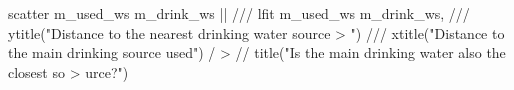 scatter m_used_ws m_drink_ws  || ///
lfit m_used_ws m_drink_ws, ///
        ytitle("Distance to the nearest drinking water source
> ") ///
        xtitle("Distance to the main drinking source used") /
> //
        title("Is the main drinking water also the closest so
> urce?")
